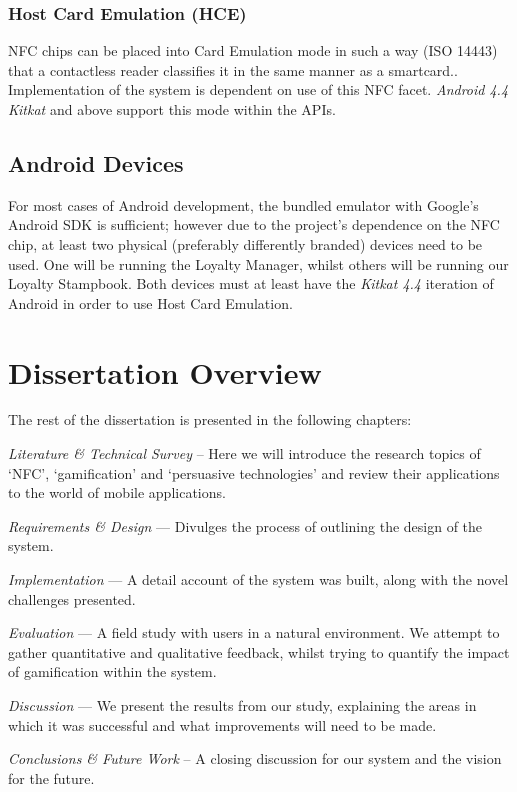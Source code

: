\subsubsection{Host Card Emulation (HCE)}
\label{sec:initalHCE}
NFC chips can be placed into Card Emulation mode in such a way (ISO 14443) that a contactless reader classifies it in the same manner as a smartcard.\cite{ecosystem}. Implementation of the system is dependent on use of this NFC facet. \emph{Android 4.4 Kitkat} and above support this mode within the APIs.
\subsection{Android Devices}
For most cases of Android development, the bundled emulator with Google's Android SDK is sufficient; however due to the project's dependence on the NFC chip, at least two physical (preferably differently branded) devices need to be used. One will be running the Loyalty Manager, whilst others will be running our Loyalty Stampbook. Both devices must at least have the \emph{Kitkat 4.4} iteration of Android in order to use Host Card Emulation.

\section{Dissertation Overview}
The rest of the dissertation is presented in the following chapters:
\begin{description}[leftmargin=!,labelwidth=\widthof{\bfseries Medium}]
    \item[Chapter 2] \emph{Literature \& Technical Survey} -- Here we will introduce the research topics of `NFC', `gamification' and `persuasive technologies' and review their applications to the world of mobile applications. 
    \item[Chapter 3] \emph{Requirements \& Design} --- Divulges the process of outlining the design of the system.
    \item[Chapter 4] \emph{Implementation} --- A detail account of the system was built, along with the novel challenges presented. 
    \item[Chapter 5] \emph{Evaluation} --- A field study with users in a natural environment. We attempt to gather quantitative and qualitative feedback, whilst trying to quantify the impact of gamification within the system. 
    \item[Chapter 6] \emph{Discussion} --- We present the results from our study, explaining the areas in which it was successful and what improvements will need to be made. 
    \item[Chapter 7] \emph{Conclusions \& Future Work} -- A closing discussion for our system and the vision for the future. 
\end{description}